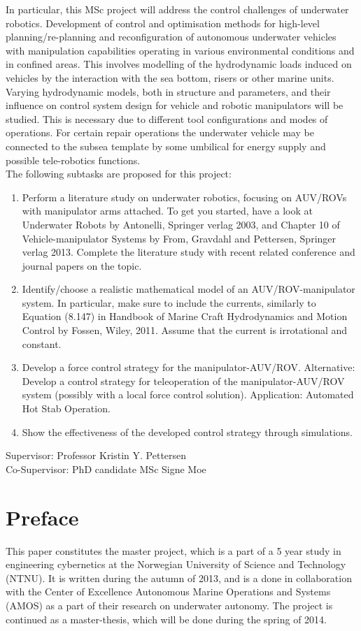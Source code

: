 In particular, this MSc project will address the control challenges of underwater robotics. Development of control and optimisation methods for high-level planning/re-planning and reconfiguration of autonomous underwater vehicles with manipulation capabilities operating in various environmental conditions and in confined areas. This involves modelling of the hydrodynamic loads induced on vehicles by the interaction with the sea bottom, risers or other marine units. Varying hydrodynamic models, both in structure and parameters, and their influence on control system design for vehicle and robotic manipulators will be studied. This is necessary due to different tool configurations and modes of operations. For certain repair operations the underwater vehicle may be connected to the subsea template by some umbilical for energy supply and possible tele-robotics functions.
\\
The following subtasks are proposed for this project:
\begin{enumerate}
	\item Perform a literature study on underwater robotics, focusing on AUV/ROVs with manipulator arms attached. To get you started, have a look at Underwater Robots by Antonelli, Springer verlag 2003, and Chapter 10 of Vehicle-manipulator Systems by From, Gravdahl and Pettersen, Springer verlag 2013. Complete the literature study with recent related conference and journal papers on the topic.
	\item Identify/choose a realistic mathematical model of an AUV/ROV-manipulator system. In particular, make sure to include the currents, similarly to Equation (8.147) in Handbook of Marine Craft Hydrodynamics and Motion Control by Fossen, Wiley, 2011. Assume that the current is irrotational and constant.
	\item Develop a force control strategy for the manipulator-AUV/ROV.  Alternative: Develop a control strategy for teleoperation of the manipulator-AUV/ROV system (possibly with a local force control solution). Application: Automated Hot Stab Operation.
	\item Show the effectiveness of the developed control strategy through simulations.
\end{enumerate}

Supervisor: Professor Kristin Y. Pettersen\\
\indent Co-Supervisor: PhD candidate MSc Signe Moe

\clearpage


\section*{Preface}
\noindent This paper constitutes the master project, which is a part of a 5 year study in engineering cybernetics at the Norwegian University of Science and Technology (NTNU). 
It is written during the autumn of 2013, and is a done in collaboration with the Center of Excellence Autonomous Marine Operations and Systems (AMOS) as a part of their research on underwater autonomy. The project is continued as a master-thesis, which will be done during the spring of 2014. 
\bigskip
\bigskip
\bigskip
\bigskip

